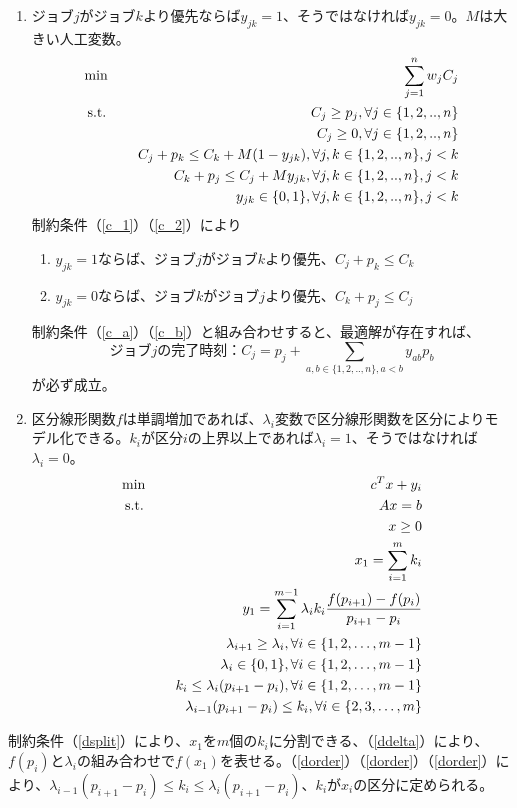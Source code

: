 \documentclass{jsarticle}
\begin{document}
\begin{enumerate}
\item 
ジョブ$j$がジョブ$k$より優先ならば$y_{jk}=1$、そうではなければ$y_{jk}=0$。$M$は大きい人工変数。
\begin{eqnarray}
\text{min \,\,\,\,\,} && \sum_{j=1}^n w_jC_j\\
\text{s.t. \,\,\,\,\,}&& C_j \ge p_j, \forall j \in \{1,2,..,n\} \label{c_a}\\
&& C_j \ge 0, \forall j \in \{1,2,..,n\}  \label{c_b} \\
&& C_j + p_k \le C_k + M(1-y_{jk}), \forall j,k \in \{1,2,..,n\} , j<k \label{c_1} \\
&& C_k + p_j \le C_j + My_{jk},  \forall j,k \in \{1,2,..,n\} , j<k \label{c_2} \\
&& y_{jk} \in \{0,1\}, \forall j,k \in \{1,2,..,n\} , j<k
\end{eqnarray}
制約条件（\ref{c_1}）（\ref{c_2}）により
\begin{enumerate}
\item $y_{jk}=1$ならば、ジョブ$j$がジョブ$k$より優先、$C_j + p_k \le C_k$
\item $y_{jk}=0$ならば、ジョブ$k$がジョブ$j$より優先、$C_k + p_j \le C_j$
\end{enumerate}
制約条件（\ref{c_a}）（\ref{c_b}）と組み合わせすると、最適解が存在すれば、
\[
\text{ジョブ$j$の完了時刻：}C_j = p_j + \sum_{a,b \in \{1,2,..,n\} ,a < b} y_{ab}p_b
\]
が必ず成立。
\item 
区分線形関数$f$は単調増加であれば、$\lambda_i$変数で区分線形関数を区分によりモデル化できる。$k_i$が区分$i$の上界以上であれば$\lambda_i=1$、そうではなければ$\lambda_i=0$。
\begin{eqnarray}
\text{min \,\,\,\,\,}&& c^Tx+y_i \\
\text{s.t. \,\,\,\,\,}&& Ax=b \\
&&x \ge 0\\
&&x_1 = \sum_{i=1}^m k_i \label{dsplit}\\
&& y_1 = \sum_{i=1}^{m-1} \lambda_i k_i \frac{f(p_{i+1})-f(p_{i})}{p_{i+1}-p_i} \label{ddelta}\\
&& \lambda_{i+1} \ge \lambda_i, \forall i \in \{1,2,\dots,m-1\} \label{dorder}\\
&& \lambda_i \in \{0,1\}, \forall i \in \{1,2,\dots,m-1\} \\
&& k_i \le \lambda_i(p_{i+1}- p_{i}), \forall i \in \{1,2,\dots,m-1\} \label{do1} \\
&& \lambda_{i-1}(p_{i+1} - p_{i}) \le k_i, \forall i \in \{2,3,\dots,m \} \label{do2}
\end{eqnarray}
\end{enumerate}
制約条件（\ref{dsplit}）により、$x_1$を$m$個の$k_i$に分割できる、（\ref{ddelta}）により、$f(p_i)$と$\lambda_i$の組み合わせで$f(x_1)$を表せる。（\ref{dorder}）（\ref{dorder}）（\ref{dorder}）により、$\lambda_{i-1}(p_{i+1} - p_{i}) \le k_i \le \lambda_i(p_{i+1}- p_{i})$、$k_i$が$x_i$の区分に定められる。
\end{document}

